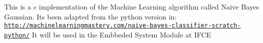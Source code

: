 This is a c implementation of the Machine Learning algorithm called Naive Bayes Gaussian. It\textquotesingle{}s been adapted from the python version in\+: \href{http://machinelearningmastery.com/naive-bayes-classifier-scratch-python/}{\tt http\+://machinelearningmastery.\+com/naive-\/bayes-\/classifier-\/scratch-\/python/} It will be used in the Embbeded System Module at I\+F\+CE 